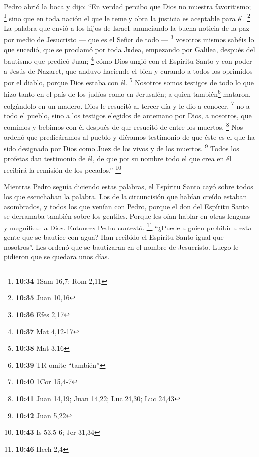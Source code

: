 \begin{paracol}{2}
 Pedro abrió la boca y dijo: ``En verdad percibo que Dios
no muestra favoritismo; \footnote{\textbf{10:34} 1Sam 16,7; Rom 2,11}
 sino que en toda nación el que le teme y obra la
justicia es aceptable para él. \footnote{\textbf{10:35} Juan 10,16}
 La palabra que envió a los hijos de Israel, anunciando
la buena noticia de la paz por medio de Jesucristo --- que es el Señor
de todo --- \footnote{\textbf{10:36} Efes 2,17}  vosotros
mismos sabéis lo que sucedió, que se proclamó por toda Judea, empezando
por Galilea, después del bautismo que predicó Juan; \footnote{\textbf{10:37}
  Mat 4,12-17}  cómo Dios ungió con el Espíritu Santo y
con poder a Jesús de Nazaret, que anduvo haciendo el bien y curando a
todos los oprimidos por el diablo, porque Dios estaba con él.
\footnote{\textbf{10:38} Mat 3,16}  Nosotros somos
testigos de todo lo que hizo tanto en el país de los judíos como en
Jerusalén; a quien también\footnote{\textbf{10:39} TR omite ``también''}
mataron, colgándolo en un madero.  Dios le resucitó al
tercer día y le dio a conocer, \footnote{\textbf{10:40} 1Cor 15,4-7}
 no a todo el pueblo, sino a los testigos elegidos de
antemano por Dios, a nosotros, que comimos y bebimos con él después de
que resucitó de entre los muertos. \footnote{\textbf{10:41} Juan 14,19;
  Juan 14,22; Luc 24,30; Luc 24,43}  Nos ordenó que
predicáramos al pueblo y diéramos testimonio de que éste es el que ha
sido designado por Dios como Juez de los vivos y de los muertos.
\footnote{\textbf{10:42} Juan 5,22}  Todos los profetas
dan testimonio de él, de que por su nombre todo el que crea en él
recibirá la remisión de los pecados.'' \footnote{\textbf{10:43} Is
  53,5-6; Jer 31,34}

 Mientras Pedro seguía diciendo estas palabras, el
Espíritu Santo cayó sobre todos los que escuchaban la palabra.
 Los de la circuncisión que habían creído estaban
asombrados, y todos los que venían con Pedro, porque el don del Espíritu
Santo se derramaba también sobre los gentiles.  Porque
les oían hablar en otras lenguas y magnificar a Dios. Entonces Pedro
contestó: \footnote{\textbf{10:46} Hech 2,4}  ``¿Puede
alguien prohibir a esta gente que se bautice con agua? Han recibido el
Espíritu Santo igual que nosotros''.  Les ordenó que se
bautizaran en el nombre de Jesucristo. Luego le pidieron que se quedara
unos días.


\end{paracol}
